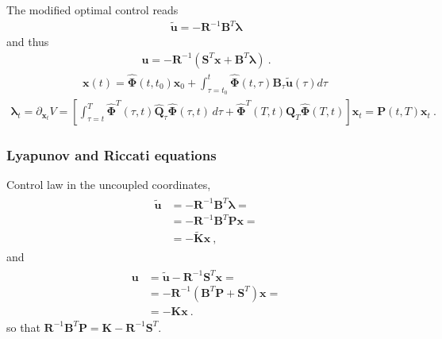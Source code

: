 \documentclass[letterpaper,10pt,english]{jupyterBook}
\begin{document}
\sphinxAtStartPar
The modified optimal control reads
\begin{equation*}
\begin{split}\widetilde{\mathbf{u}} = - \mathbf{R}^{-1} \mathbf{B}^T \boldsymbol\lambda\end{split}
\end{equation*}
\sphinxAtStartPar
and thus
\begin{equation*}
\begin{split}\mathbf{u} = - \mathbf{R}^{-1} \left( \mathbf{S}^T \mathbf{x} + \mathbf{B}^T \boldsymbol\lambda \right) \ .\end{split}
\end{equation*}\begin{equation*}
\begin{split}\mathbf{x}(t) = \hat{\boldsymbol\Phi}(t,t_0)\mathbf{x}_0 + \int_{\tau=t_0}^{t} \hat{\boldsymbol\Phi}(t,\tau) \mathbf{B}_\tau \widetilde{\mathbf{u}}(\tau) d \tau \ \end{split}
\end{equation*}\begin{equation*}
\begin{split}\boldsymbol\lambda_t = \partial_{\mathbf{x}_t} V = \left[ \int_{\tau=t}^{T} \hat{\boldsymbol\Phi}^T(\tau,t) \hat{\mathbf{Q}}_\tau \hat{\boldsymbol\Phi}(\tau,t) \, d \tau + \hat{\boldsymbol\Phi}^T(T,t) \mathbf{Q}_T \hat{\boldsymbol\Phi}(T,t) \right] \mathbf{x}_t = \mathbf{P}(t,T) \mathbf{x}_t \ . \end{split}
\end{equation*}\subsubsection*{Lyapunov and Riccati equations}

\sphinxAtStartPar
Control law in the uncoupled coordinates,
\begin{equation*}
\begin{split}\begin{aligned}
  \widetilde{\mathbf{u}}
  & = - \mathbf{R}^{-1} \mathbf{B}^T \boldsymbol\lambda = \\
  & = - \mathbf{R}^{-1} \mathbf{B}^T \mathbf{P} \mathbf{x} = \\
  & = - \widetilde{\mathbf{K}} \mathbf{x} \ ,
\end{aligned}\end{split}
\end{equation*}
\sphinxAtStartPar
and
\begin{equation*}
\begin{split}\begin{aligned}
  \mathbf{u} 
  & = \widetilde{\mathbf{u}} - \mathbf{R}^{-1} \mathbf{S}^T \mathbf{x} = \\
  & = - \mathbf{R}^{-1} \left( \mathbf{B}^T \mathbf{P} + \mathbf{S}^T \right) \mathbf{x} = \\
  & = - \mathbf{K} \mathbf{x} \ .
\end{aligned}\end{split}
\end{equation*}
\sphinxAtStartPar
so that \(\mathbf{R}^{-1} \mathbf{B}^T \mathbf{P} = \mathbf{K} - \mathbf{R}^{-1} \mathbf{S}^T\).
\end{document}
